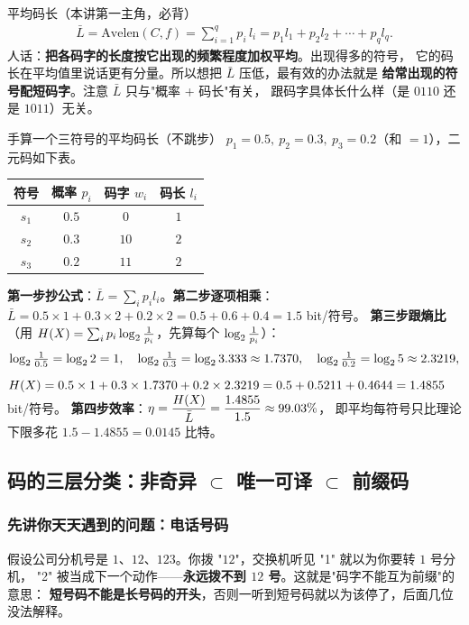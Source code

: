 \begin{defbox}{平均码长（本讲第一主角，必背）}
\begin{align*}
\bar L=\mathrm{Avelen}(C,f)=\sum_{i=1}^{q}p_i\,l_i=p_1l_1+p_2l_2+\cdots+p_ql_q .
\end{align*}
人话：\textbf{把各码字的长度按它出现的频繁程度加权平均}。出现得多的符号，
它的码长在平均值里说话更有分量。所以想把 $\bar L$ 压低，最有效的办法就是
\textbf{给常出现的符号配短码字}。注意 $\bar L$ 只与"概率 + 码长"有关，
跟码字具体长什么样（是 $0110$ 还是 $1011$）无关。
\end{defbox}

\begin{calc}{手算一个三符号的平均码长（不跳步）}
$p_1=0.5,\ p_2=0.3,\ p_3=0.2$（和 $=1$），二元码如下表。

\begin{center}
\begin{tabular}{@{}cccc@{}}
\toprule
符号 & 概率 $p_i$ & 码字 $w_i$ & 码长 $l_i$\\
\midrule
$s_1$ & $0.5$ & $0$  & $1$\\
$s_2$ & $0.3$ & $10$ & $2$\\
$s_3$ & $0.2$ & $11$ & $2$\\
\bottomrule
\end{tabular}
\end{center}

\textbf{第一步抄公式}：$\bar L=\sum_i p_il_i$。\textbf{第二步逐项相乘}：
$\bar L=0.5\times1+0.3\times2+0.2\times2=0.5+0.6+0.4=1.5$ bit/符号。
\textbf{第三步跟熵比}（用 $H\!\left(X\right)=\sum_i p_i\log_{2}\frac{1}{p_i}$，先算每个 $\log_{2}\frac1{p_i}$）：
\begin{align*}
\log_{2}\tfrac{1}{0.5}=\log_{2} 2=1,\quad
\log_{2}\tfrac{1}{0.3}=\log_{2} 3.333\approx1.7370,\quad
\log_{2}\tfrac{1}{0.2}=\log_{2} 5\approx2.3219,
\end{align*}
$H\!\left(X\right)=0.5\times1+0.3\times1.7370+0.2\times2.3219=0.5+0.5211+0.4644=1.4855$ bit/符号。
\textbf{第四步效率}：$\eta=\dfrac{H\!\left(X\right)}{\bar L}=\dfrac{1.4855}{1.5}\approx99.03\%$，
即平均每符号只比理论下限多花 $1.5-1.4855=0.0145$ 比特。
\end{calc}

\subsection{码的三层分类：非奇异 $\subset$ 唯一可译 $\subset$ 前缀码}

\subsubsection{先讲你天天遇到的问题：电话号码}
假设公司分机号是 $1$、$12$、$123$。你拨 "$12$"，交换机听见 "1" 就以为你要转 $1$ 号分机，
"2" 被当成下一个动作——\textbf{永远拨不到 $12$ 号}。这就是"码字不能互为前缀"的意思：
\textbf{短号码不能是长号码的开头}，否则一听到短号码就以为该停了，后面几位没法解释。

